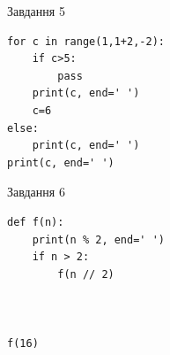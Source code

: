 \documentclass[12pt, ukrainian]{article}
\begin{document}
{\vspace{15mm}
\begin{minipage}[t]{9.7cm}                
{\begin{center}Завдання {5}\end{center}}
\begin{verbatim}
for c in range(1,1+2,-2):
    if c>5:
        pass
    print(c, end=' ')
    c=6
else:
    print(c, end=' ')
print(c, end=' ')
\end{verbatim}     
\end{minipage}
\vline \hspace{8mm}
\begin{minipage}[t]{8.0cm}                
{\begin{center}Завдання {6}\end{center}}
\begin{verbatim}
def f(n):
    print(n % 2, end=' ')
    if n > 2:
        f(n // 2)
    


f(16)
\end{verbatim}     
\end{minipage}

}
\newpage
\end{document}
